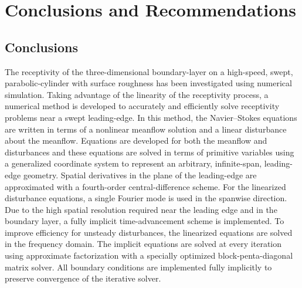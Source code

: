 %
%
%
%
%
\chapter{Conclusions and Recommendations\label{c:conclude}}

\section{Conclusions}

The receptivity of the three-dimensional boundary-layer on a high-speed,
swept, parabolic-cylinder with surface roughness has been investigated using
numerical simulation.  Taking advantage of the linearity of the receptivity
process, a numerical method is developed to accurately and efficiently solve
receptivity problems near a swept leading-edge.  In this method, the
Navier--Stokes equations are written in terms of a nonlinear meanflow
solution and a linear disturbance about the meanflow.  Equations are
developed for both the meanflow and disturbances and these equations are
solved in terms of primitive variables using a generalized coordinate system
to represent an arbitrary, infinite-span, leading-edge geometry.
%
%
Spatial derivatives in the plane of the leading-edge are approximated with a
fourth-order central-difference scheme.  For the linearized disturbance
equations, a single Fourier mode is used in the spanwise direction.  Due to
the high spatial resolution required near the leading edge and in the boundary
layer, a fully implicit time-advancement scheme is implemented.  To improve
efficiency for unsteady disturbances, the linearized equations are solved in
the frequency domain.  The implicit equations are solved at every iteration
using approximate factorization with a specially optimized
block-penta-diagonal matrix solver.  All boundary conditions are implemented
fully implicitly to preserve convergence of the iterative solver.

